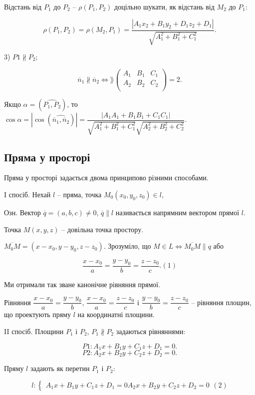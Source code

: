 Відстань від $P_1$ до $P_2$ -- $\rho(P_1,P_2)$ доцільно шукати, як відстань від $M_2$ до $P_1$:

$$\rho(P_1,P_2) = \rho(M_2,P_1) = \dfrac{|A_1 x_2 + B_1 y_2 + D_1 z_2 + D_1|}{\sqrt{A_1^2 + B_1^2 + C_1^2}}.$$


3) $P1 \nparallel P_2$;

$$\overline{n}_1 \nparallel \overline{n}_2 \Leftrightarrow \rang \begin{pmatrix}
	A_1 & B_1 & C_1 \\
	A_2 & B_2 & C_2 \\
\end{pmatrix} = 2.$$


Якщо $\alpha = (\widehat{P_1,P_2})$, то $\cos \alpha = |\cos(\widehat{\overline{n}_1,\overline{n}_2})|
= \dfrac{|A_1A_1 + B_1B_1 + C_1C_1|}{\sqrt{A_1^2 + B_1^2 + C_1^2}\sqrt{A_2^2 + B_2^2 + C_2^2}}$.


\subsection{Пряма у просторі}


Пряма у просторі задається двома принципово різними способами.

I спосіб. Нехай $l$ -- пряма, точка $M_0(x_0,y_0,z_0) \in l$,


Озн. Вектор $\overline{q} = (a,b,c) \neq 0$, $\overline{q} \parallel l$ називається напрямним вектором
прямої $l$.

Точка $M(x,y,z)$ -- довільна точка простору.


$\overline{M_0M} = (x-x_0,y-y_0,z-z_0)$.
Зрозуміло, що $M \in L \Leftrightarrow \overline{M_0M} \parallel q$ або

$$\dfrac{x-x_0}{a} = \dfrac{y-y_0}{b} = \dfrac{z-z_0}{c}.(1)$$

Ми отримали так зване канонічне
рівняння прямої.


Рівняння $\dfrac{x-x_0}{a} = \dfrac{y-y_0}{b}$, $\dfrac{x-x_0}{a} = \dfrac{z-z_0}{c}$
і $\dfrac{y-y_0}{b} = \dfrac{z-z_0}{c}$ -- рівняння
площин, що проектують пряму $l$ на координатні площини.

II спосіб. Площини $P_1$ і $P_2$, $P_1 \nparallel P_2$ задаються рівняннями:

$$P1: A_1x + B_1y + C_1z + D_1 = 0.$$
$$P2: A_2x + B_2y + C_2z + D_2 = 0.$$

Пряму $l$ задають як перетин $P_1$ і $P_2$:

$$l: \left\{ \begin{matrix}
	A_1x + B_1y + C_1z + D_1 = 0
	A_2x + B_2y + C_2z + D_2 = 0
\end{matrix} \right. (2)$$


